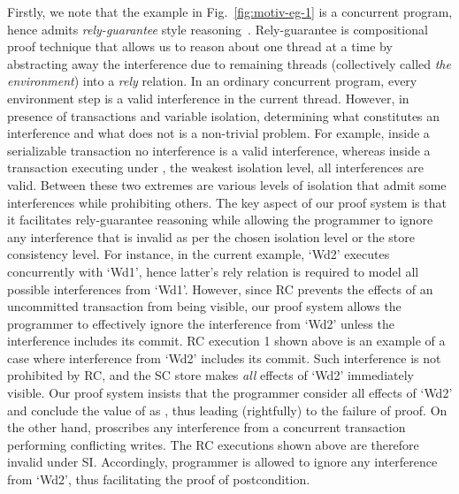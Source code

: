 Firstly, we note that the example in Fig.~\ref{fig:motiv-eg-1} is a
concurrent program, hence admits \emph{rely-guarantee} style
reasoning~\cite{rgjones}. Rely-guarantee is compositional proof
technique that allows us to reason about one thread at a time by
abstracting away the interference due to remaining threads
(collectively called \emph{the environment}) into a \emph{rely}
relation. In an ordinary concurrent program, every environment step is
a valid interference in the current thread. However, in presence of
transactions and variable isolation, determining what constitutes an
interference and what does not is a non-trivial problem. For example,
inside a serializable transaction no interference is a valid
interference, whereas inside a transaction executing under , the weakest isolation level, all interferences are
valid. Between these two extremes are various levels of isolation
that admit some interferences while prohibiting others. 
The key aspect of our proof system is that it facilitates
rely-guarantee reasoning while allowing the programmer to ignore any
interference that is invalid as per the chosen isolation level or the
store consistency level. For instance, in the current example, `Wd2'
executes concurrently with `Wd1', hence latter's rely relation is
required to model all possible interferences from `Wd1'. However,
since RC prevents the effects of an uncommitted transaction from being
visible, our proof system allows the programmer to effectively ignore
the interference from `Wd2' unless the interference includes its
commit. RC execution 1 shown above is an example of a case where
interference from `Wd2' includes its commit. Such interference is not
prohibited by RC, and the SC store makes \emph{all} effects of `Wd2'
immediately visible. Our proof system insists that the
programmer consider all effects of `Wd2' and conclude the value of
 as , thus leading (rightfully) to the failure of proof.
On the other hand,  proscribes any
interference from a concurrent transaction performing conflicting
writes. The RC executions shown above are therefore invalid under SI.
Accordingly, programmer is allowed to ignore any interference from
`Wd2', thus facilitating the proof of postcondition.

